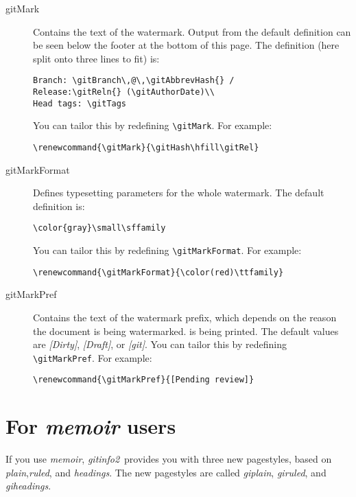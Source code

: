 \documentclass[draft,a4paper,12pt,twoside,openany]{memoir}
\newcommand{\sfit}[1]{\textit{#1}}
\newcommand{\tpname}{\sfit{gitinfo2}}
\begin{document}
\begin{description}

\item[gitMark]
    Contains the text of the watermark. 
    Output from the default definition can be seen
    below the footer
    at the bottom of this page.
    The definition 
    (here split onto three lines to fit) 
    is:

\begin{verbatim}
Branch: \gitBranch\,@\,\gitAbbrevHash{} / 
Release:\gitReln{} (\gitAuthorDate)\\
Head tags: \gitTags
\end{verbatim}
You can tailor this by redefining \verb!\gitMark!. 
For example: 

\begin{verbatim}
\renewcommand{\gitMark}{\gitHash\hfill\gitRel}
\end{verbatim}

\item[gitMarkFormat]
    Defines typesetting parameters for the whole watermark.
    The default definition is:

\begin{verbatim}
\color{gray}\small\sffamily
\end{verbatim}
You can tailor this by redefining \verb!\gitMarkFormat!. For example: 

\begin{verbatim}
\renewcommand{\gitMarkFormat}{\color(red)\ttfamily}
\end{verbatim}

\item[gitMarkPref]
    Contains the text of the watermark prefix, 
    which depends on the reason the document is being watermarked.
    is being printed.
    The default values are \sfit{[Dirty]}, \sfit{[Draft]}, or \sfit{[git]}.
    You can tailor this by redefining \verb!\gitMarkPref!. For example: 

\begin{verbatim}
\renewcommand{\gitMarkPref}{[Pending review]}
\end{verbatim}

\end{description}

\clearpage
\section{For \sfit{memoir} users}
\label{sect:memuser}
If you use \sfit{memoir}, \tpname\ provides you with
three new pagestyles, based on
\sfit{plain},\sfit{ruled}, and \sfit{headings}.
The new pagestyles are called
\sfit{giplain}, \sfit{giruled}, and \sfit{giheadings}.
\end{document}

